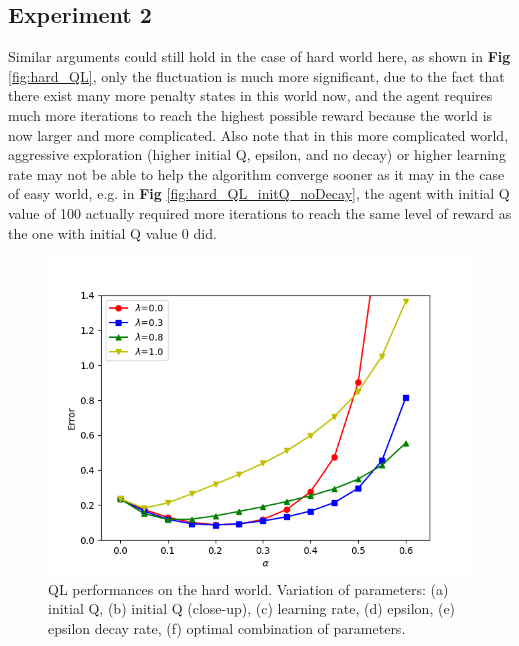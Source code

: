 \documentclass[10pt]{article}
\begin{document}
\subsection{Experiment 2} \label{results2}

Similar arguments could still hold in the case of hard world here, as shown in \textbf{Fig} \ref{fig:hard_QL}, only the fluctuation is much more significant, due to the fact that there exist many more penalty states in this world now, and the agent requires much more iterations to reach the highest possible reward because the world is now larger and more complicated. Also note that in this more complicated world, aggressive exploration (higher initial Q, epsilon, and no decay) or higher learning rate may not be able to help the algorithm converge sooner as it may in the case of easy world, e.g. in \textbf{Fig} \ref{fig:hard_QL_initQ_noDecay}, the agent with initial Q value of 100 actually required more iterations to reach the same level of reward as the one with initial Q value 0 did.


\begin{figure}[h!]
  \centering
  \includegraphics[width=\linewidth]{../results/experiment2.png}
     \caption{QL performances on the hard world. Variation of parameters: (a) initial Q, (b) initial Q (close-up), (c) learning rate, (d) epsilon, (e) epsilon decay rate, (f) optimal combination of parameters.}
  \label{fig:fig4}
\end{figure}
\end{document}
